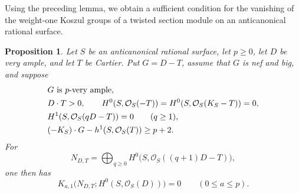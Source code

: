 \documentclass[11pt,reqno]{amsart}
\numberwithin{equation}{section}
\newtheorem{proposition}[proposition]{Proposition}
\theoremstyle{remark}
\newcommand{\sshf}[1]{\mathcal{O}_{#1}}
\begin{document}
Using the preceding lemma, we obtain a sufficient condition for
the vanishing of the weight-one Koszul groups of a twisted
section module on an anticanonical rational surface.

\begin{proposition}
\label{prop:weight-one}
Let \(S\) be an anticanonical rational surface, let \(p\geq0\), let \(D\)
be very ample, and let \(T\) be Cartier. Put \(G=D-T\), assume that
\(G\) is nef and big, and suppose
\begin{align}
 &G\ \text{is \(p\)-very ample},\notag\\
 &D\cdot T>0,\qquad
 H^0(S,\sshf{S}(-T))=H^0(S,\sshf{S}(K_S-T))=0,
 \label{eq:weight-hyp2}\\
 &H^1(S,\sshf{S}(qD-T))=0\qquad(q\geq1),
 \label{eq:weight-hyp3}\\
 &(-K_S)\cdot G-h^1(S,\sshf{S}(T))\geq p+2.\notag
\end{align}
For
\[
 N_{D,T}=\bigoplus_{q\geq0}
 H^0\bigl(S,\sshf{S}((q+1)D-T)\bigr),
\]
one then has
\[
 K_{a,1}\bigl(N_{D,T};H^0(S,\sshf{S}(D))\bigr)=0
 \qquad(0\leq a\leq p).
\]
\end{proposition}
\end{document}
